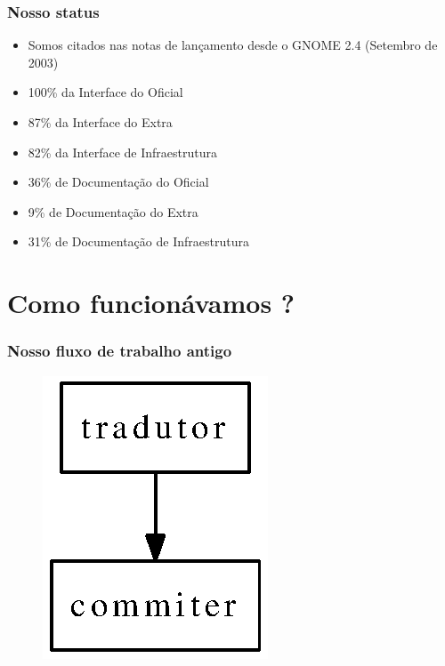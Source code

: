 \documentclass{beamer}
\begin{document}
\begin{frame}
    \frametitle[Para o GNOME 2.28]{Nosso status}    
    \begin{itemize}[<+->]
        \item \color[rgb]{0,1,0}   Somos citados nas notas de lançamento desde o GNOME 2.4 (Setembro de 2003)  
        \item \color[rgb]{0,1,0}  100\% da Interface do Oficial 
        \item \color[rgb]{0,1,0}  87\% da Interface do Extra
        \item \color[rgb]{0,1,0}  82\% da Interface de Infraestrutura
        \item \color[rgb]{1,0,0} 36\% de Documentação do Oficial
        \item \color[rgb]{1,0,0} 9\%  de Documentação do Extra
        \item \color[rgb]{1,0,0} 31\% de Documentação de Infraestrutura
    \end{itemize}

\end{frame}

\section{Como funcionávamos ?}

\begin{frame}
    \frametitle{Nosso fluxo de trabalho antigo}
    \begin{figure}[ht]
        \includegraphics{figures/fluxo_antigo.eps}     
    \end{figure}
\end{frame}
\end{document}

